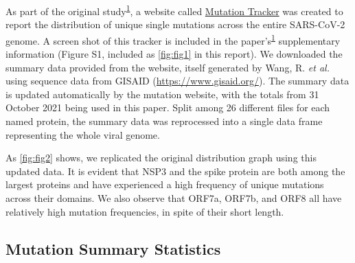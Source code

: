 \documentclass{article}
\begin{document}
As part of the original
study\textsuperscript{\protect\hyperlink{ref-Wang2021}{1}}, a website
called
\href{https://users.math.msu.edu/users/weig/SARS-CoV-2_Mutation_Tracker.html}{Mutation
Tracker} was created to report the distribution of unique single
mutations across the entire SARS-CoV-2 genome. A screen shot of this
tracker is included in the
paper's\textsuperscript{\protect\hyperlink{ref-Wang2021}{1}}
supplementary information (Figure S1, included as \autoref{fig:fig1} in
this report). We downloaded the summary data provided from the website,
itself generated by Wang, R. \emph{et al.} using sequence data from
GISAID (\url{https://www.gisaid.org/}). The summary data is updated
automatically by the mutation website, with the totals from 31 October
2021 being used in this paper. Split among 26 different files for each
named protein, the summary data was reprocessed into a single data frame
representing the whole viral genome.

As \autoref{fig:fig2} shows, we replicated the original distribution
graph using this updated data. It is evident that NSP3 and the spike
protein are both among the largest proteins and have experienced a high
frequency of unique mutations across their domains. We also observe that
ORF7a, ORF7b, and ORF8 all have relatively high mutation frequencies, in
spite of their short length.

\hypertarget{mutation-summary-statistics}{%
\subsection{Mutation Summary
Statistics}\label{mutation-summary-statistics}}
\end{document}
